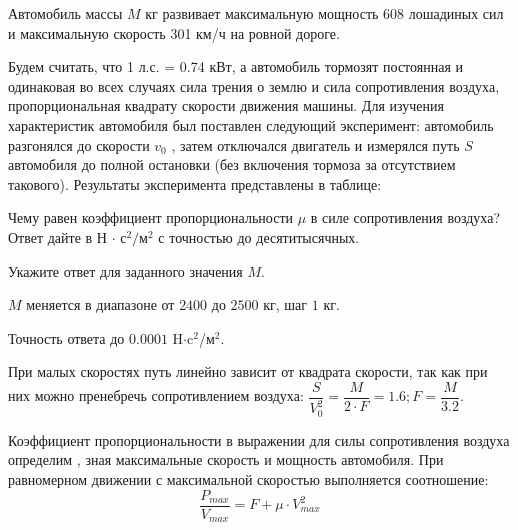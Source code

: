 
Автомобиль массы $M$ кг развивает максимальную мощность 608 лошадиных сил и максимальную скорость
301 км/ч на ровной дороге. 

Будем считать, что 1 л.с. = 0.74  кВт, а автомобиль тормозят постоянная и одинаковая во всех случаях сила трения о землю и сила сопротивления воздуха, пропорциональная квадрату скорости
движения машины. Для изучения характеристик автомобиля был поставлен следующий
эксперимент: автомобиль разгонялся до скорости $v_0$ , затем отключался двигатель и измерялся путь $S$ 
автомобиля до полной остановки (без включения тормоза за отсутствием такового).
Результаты эксперимента представлены в таблице:


Чему равен коэффициент пропорциональности $\mu$ в
силе сопротивления воздуха? Ответ дайте в Н $\cdot$ с$^2/$м$^2$ с точностью до десятитысячных.

Укажите ответ для заданного значения $M$.

\paramSection

$M$ меняется в диапазоне от $2400$ до $2500$ кг, шаг $1$ кг.

Точность ответа до  $0.0001$  H$\cdot$c$^2$/м$^2$.

\soultionSection

При малых скоростях путь линейно зависит от квадрата скорости, так как при них можно пренебречь сопротивлением воздуха: 
$\dfrac{S}{V_0^2} = \dfrac{M}{2 \cdot F}=1.6;  F=\dfrac{M}{3.2}.$ 

Коэффициент пропорциональности в выражении для силы сопротивления воздуха определим , зная максимальные скорость и мощность автомобиля. 
При  равномерном движении с максимальной скоростью выполняется соотношение:   $$\dfrac{P_{max}}{V_{max}} =F+\mu \cdot V_{max}^2 $$

